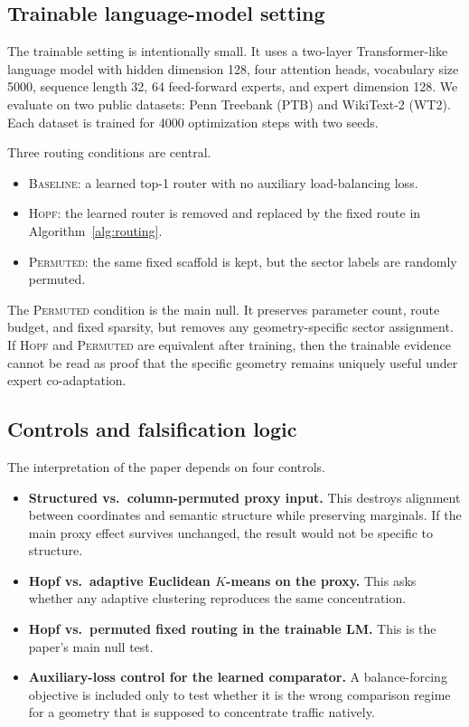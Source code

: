 \documentclass[10pt,letterpaper]{article}
\begin{document}
\subsection{Trainable language-model setting}
The trainable setting is intentionally small. It uses a two-layer Transformer-like language model with hidden dimension 128, four attention heads, vocabulary size 5000, sequence length 32, 64 feed-forward experts, and expert dimension 128. We evaluate on two public datasets: Penn Treebank (PTB) and WikiText-2 (WT2). Each dataset is trained for 4000 optimization steps with two seeds.

Three routing conditions are central.
\begin{itemize}
\item \textsc{Baseline}: a learned top-1 router with no auxiliary load-balancing loss.
\item \textsc{Hopf}: the learned router is removed and replaced by the fixed route in Algorithm~\ref{alg:routing}.
\item \textsc{Permuted}: the same fixed scaffold is kept, but the sector labels are randomly permuted.
\end{itemize}

The \textsc{Permuted} condition is the main null. It preserves parameter count, route budget, and fixed sparsity, but removes any geometry-specific sector assignment. If \textsc{Hopf} and \textsc{Permuted} are equivalent after training, then the trainable evidence cannot be read as proof that the specific geometry remains uniquely useful under expert co-adaptation.

\subsection{Controls and falsification logic}
The interpretation of the paper depends on four controls.
\begin{itemize}
\item \textbf{Structured vs.\ column-permuted proxy input.} This destroys alignment between coordinates and semantic structure while preserving marginals. If the main proxy effect survives unchanged, the result would not be specific to structure.
\item \textbf{Hopf vs.\ adaptive Euclidean $K$-means on the proxy.} This asks whether any adaptive clustering reproduces the same concentration.
\item \textbf{Hopf vs.\ permuted fixed routing in the trainable LM.} This is the paper's main null test.
\item \textbf{Auxiliary-loss control for the learned comparator.} A balance-forcing objective is included only to test whether it is the wrong comparison regime for a geometry that is supposed to concentrate traffic natively.
\end{itemize}
\end{document}
